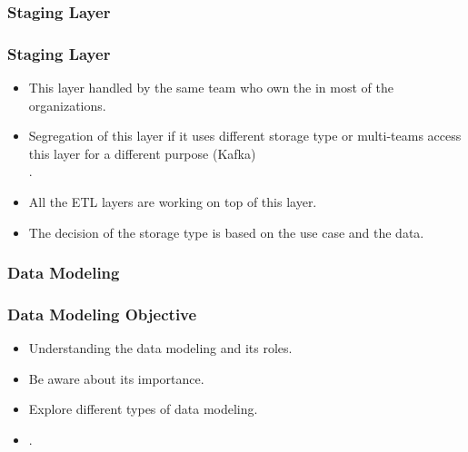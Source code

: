 
\subsubsection{Staging Layer}
\begin{frame}
    \frametitle{Staging Layer}
    \begin{itemize}[<+->]
        \item This layer handled by the same team who own the  in most of the organizations.
        \item Segregation of this layer if it uses different storage type or multi-teams access this layer for a different purpose \faEdit \space \faArrowCircleORight \space (Kafka)\\ .
        \item All the ETL layers are working on top of this layer.
        \item The decision of the storage type is based on the use case and the data.

    \end{itemize}

\end{frame}


\subsubsection{Data Modeling}


\begin{frame}
    \frametitle{Data Modeling Objective}
    \begin{itemize}[<+->]
        \item Understanding the data modeling and its roles.
        \item Be aware about its importance.
        \item Explore different types of data modeling.
        \item {}.

    \end{itemize}

\end{frame}

